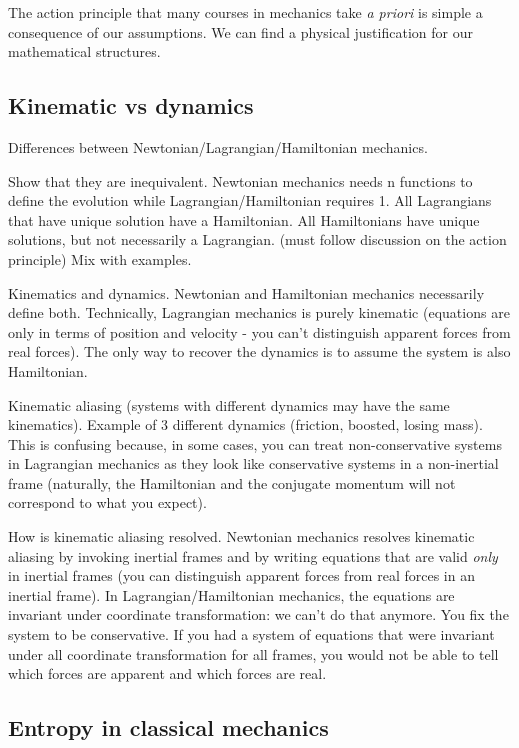 \documentclass{article}[a4paper]
\begin{document}
The action principle that many courses in mechanics take \emph{a priori} is simple a consequence of our assumptions. We can find a physical justification for our mathematical structures.

\subsection{Kinematic vs dynamics}

Differences between Newtonian/Lagrangian/Hamiltonian mechanics.

Show that they are inequivalent. Newtonian mechanics needs n functions to define the evolution while Lagrangian/Hamiltonian requires 1. All Lagrangians that have unique solution have a Hamiltonian. All Hamiltonians have unique solutions, but not necessarily a Lagrangian. (must follow discussion on the action principle) Mix with examples.

Kinematics and dynamics. Newtonian and Hamiltonian mechanics necessarily define both. Technically, Lagrangian mechanics is purely kinematic (equations are only in terms of position and velocity - you can't distinguish apparent forces from real forces). The only way to recover the dynamics is to assume the system is also Hamiltonian.

Kinematic aliasing (systems with different dynamics may have the same kinematics). Example of 3 different dynamics (friction, boosted, losing mass). This is confusing because, in some cases, you can treat non-conservative systems in Lagrangian mechanics as they look like conservative systems in a non-inertial frame (naturally, the Hamiltonian and the conjugate momentum will not correspond to what you expect).

How is kinematic aliasing resolved. Newtonian mechanics resolves kinematic aliasing by invoking inertial frames and by writing equations that are valid \emph{only} in inertial frames (you can distinguish apparent forces from real forces in an inertial frame).  In Lagrangian/Hamiltonian mechanics, the equations are invariant under coordinate transformation: we can't do that anymore. You fix the system to be conservative. If you had a system of equations that were invariant under all coordinate transformation for all frames, you would not be able to tell which forces are apparent and which forces are real.

\subsection{Entropy in classical mechanics}
\end{document}
